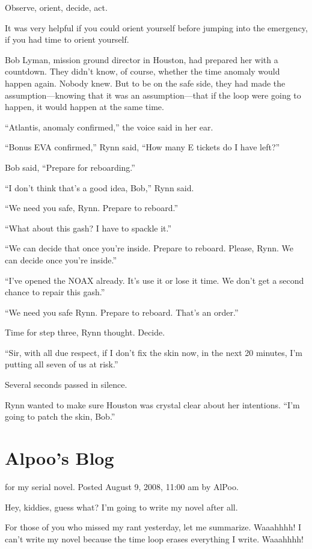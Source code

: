 Observe, orient, decide, act.

It was very helpful if you could orient yourself before jumping into the emergency, if you had time to orient yourself.

Bob Lyman, mission ground director in Houston, had prepared her with a countdown. They didn't know, of course, whether the time anomaly would happen again. Nobody knew. But to be on the safe side, they had made the assumption---knowing that it was an assumption---that if the loop were going to happen, it would happen at the same time.

``Atlantis, anomaly confirmed,'' the voice said in her ear.

``Bonus EVA confirmed,'' Rynn said, ``How many E tickets do I have left?''

Bob said, ``Prepare for reboarding.''

``I don't think that's a good idea, Bob,'' Rynn said.

``We need you safe, Rynn. Prepare to reboard.''

``What about this gash? I have to spackle it.''

``We can decide that once you're inside. Prepare to reboard. Please, Rynn. We can decide once you're inside.''

``I've opened the NOAX already. It's use it or lose it time. We don't get a second chance to repair this gash.''

``We need you safe Rynn. Prepare to reboard. That's an order.''

Time for step three, Rynn thought. Decide.

``Sir, with all due respect, if I don't fix the skin now, in the next 20 minutes, I'm putting all seven of us at risk.''

Several seconds passed in silence.

Rynn wanted to make sure Houston was crystal clear about her intentions. ``I'm going to patch the skin, Bob.''



\chapter{Alpoo's Blog}

 for my serial novel. Posted August 9, 2008, 11:00 am by AlPoo.

Hey, kiddies, guess what? I'm going to write my novel after all.

For those of you who missed my rant yesterday, let me summarize. Waaahhhh! I can't write my novel because the time loop erases everything I write. Waaahhhh!

